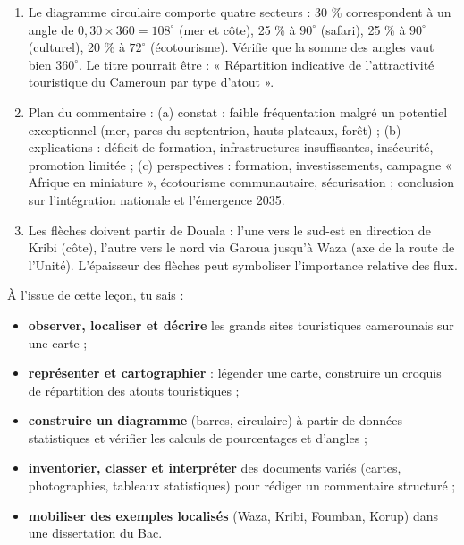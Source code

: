 \documentclass[11pt]{article}
\begin{document}
\begin{corrige}[Exercice 1]
\begin{enumerate}
\item Le diagramme circulaire comporte quatre secteurs : 30 \% correspondent à un angle de $0{,}30 \times 360 = 108^{\circ}$ (mer et côte), 25 \% à $90^{\circ}$ (safari), 25 \% à $90^{\circ}$ (culturel), 20 \% à $72^{\circ}$ (écotourisme). Vérifie que la somme des angles vaut bien $360^{\circ}$. Le titre pourrait être : « Répartition indicative de l'attractivité touristique du Cameroun par type d'atout ».
\item Plan du commentaire : (a) constat : faible fréquentation malgré un potentiel exceptionnel (mer, parcs du septentrion, hauts plateaux, forêt) ; (b) explications : déficit de formation, infrastructures insuffisantes, insécurité, promotion limitée ; (c) perspectives : formation, investissements, campagne « Afrique en miniature », écotourisme communautaire, sécurisation ; conclusion sur l'intégration nationale et l'émergence 2035.
\item Les flèches doivent partir de Douala : l'une vers le sud-est en direction de Kribi (côte), l'autre vers le nord via Garoua jusqu'à Waza (axe de la route de l'Unité). L'épaisseur des flèches peut symboliser l'importance relative des flux.
\end{enumerate}
\end{corrige}

\begin{aretenir}
À l'issue de cette leçon, tu sais :
\begin{itemize}
\item \textbf{observer, localiser et décrire} les grands sites touristiques camerounais sur une carte ;
\item \textbf{représenter et cartographier} : légender une carte, construire un croquis de répartition des atouts touristiques ;
\item \textbf{construire un diagramme} (barres, circulaire) à partir de données statistiques et vérifier les calculs de pourcentages et d'angles ;
\item \textbf{inventorier, classer et interpréter} des documents variés (cartes, photographies, tableaux statistiques) pour rédiger un commentaire structuré ;
\item \textbf{mobiliser des exemples localisés} (Waza, Kribi, Foumban, Korup) dans une dissertation du Bac.
\end{itemize}
\end{aretenir}
\end{document}

